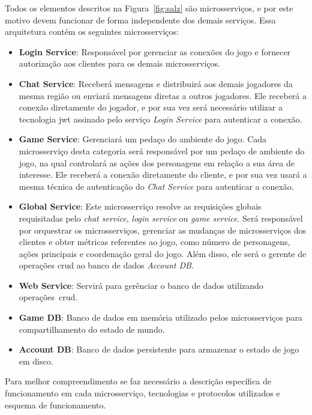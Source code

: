 Todos os elementos descritos na Figura~\ref{fig:salz} são microsserviços, e por este motivo devem funcionar de forma independente dos demais serviços.
%
Essa arquitetura contém os seguintes microsserviços:

\begin{itemize}
  \item \textbf{Login Service}: Responsável por gerenciar as conexões do jogo e fornecer autorização aos clientes para os demais microsserviços.
  \item \textbf{Chat Service}: Receberá mensagens e distribuirá aos demais jogadores da mesma região ou enviará mensagens diretas a outros jogadores. Ele receberá a conexão diretamente do jogador, e por sua vez será necessário utilizar a tecnologia \ac{jwt} assinado pelo serviço \textit{Login Service} para autenticar a conexão.
  \item \textbf{Game Service}: Gerenciará um pedaço do ambiente do jogo. Cada microsserviço desta categoria será responsável por um pedaço de ambiente do jogo, na qual controlará as ações dos personagens em relação a sua área de interesse. Ele receberá a conexão diretamente do cliente, e por sua vez usará a mesma técnica de autenticação do \textit{Chat Service} para autenticar a conexão.
  \item \textbf{Global Service}: Este microsserviço resolve as requisições globais requisitadas pelo \textit{chat service}, \textit{login service} ou \textit{game service}. Será responsável por orquestrar os microsserviços, gerenciar as mudanças de microsserviços dos clientes e obter métricas referentes ao jogo, como número de personagens, ações principais e coordenação geral do jogo. Além disso, ele será o gerente de operações \ac{crud} ao banco de dados \textit{Account DB}.
  \item \textbf{Web Service}: Servirá para gerênciar o banco de dados utilizando operações~\ac{crud}.
  \item \textbf{Game DB}: Banco de dados em memória utilizado pelos microsserviços para compartilhamento do estado de mundo.
  \item \textbf{Account DB}: Banco de dados persistente para armazenar o estado de jogo em disco.
\end{itemize}


Para melhor compreendimento se faz necessário a descrição específica de funcionamento em cada microsserviço, tecnologias e protocolos utilizados e esquema de funcionamento.



